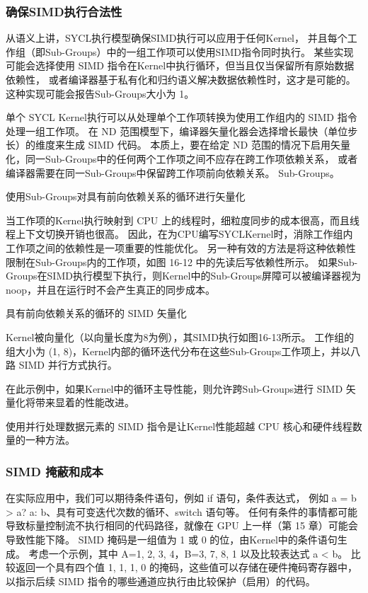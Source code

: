 \subsubsection{确保SIMD执行合法性}
从语义上讲，SYCL执行模型确保SIMD执行可以应用于任何Kernel，
并且每个工作组（即Sub-Groups）中的一组工作项可以使用SIMD指令同时执行。 
某些实现可能会选择使用 SIMD 指令在Kernel中执行循环，但当且仅当保留所有原始数据依赖性，
或者编译器基于私有化和归约语义解决数据依赖性时，这才是可能的。 这种实现可能会报告Sub-Groups大小为 1。

单个 SYCL Kernel执行可以从处理单个工作项转换为使用工作组内的 SIMD 指令处理一组工作项。 
在 ND 范围模型下，编译器矢量化器会选择增长最快（单位步长）的维度来生成 SIMD 代码。 
本质上，要在给定 ND 范围的情况下启用矢量化，同一Sub-Groups中的任何两个工作项之间不应存在跨工作项依赖关系，
或者编译器需要在同一Sub-Groups中保留跨工作项前向依赖关系。 Sub-Groups。

{\color{red} 使用Sub-Groups对具有前向依赖关系的循环进行矢量化}

当工作项的Kernel执行映射到 CPU 上的线程时，细粒度同步的成本很高，而且线程上下文切换开销也很高。 
因此，在为CPU编写SYCLKernel时，消除工作组内工作项之间的依赖性是一项重要的性能优化。 
另一种有效的方法是将这种依赖性限制在Sub-Groups内的工作项，如图 16-12 中的先读后写依赖性所示。 
如果Sub-Groups在SIMD执行模型下执行，则Kernel中的Sub-Groups屏障可以被编译器视为noop，并且在运行时不会产生真正的同步成本。

{\color{red} 具有前向依赖关系的循环的 SIMD 矢量化}

Kernel被向量化（以向量长度为8为例），其SIMD执行如图16-13所示。 
工作组的组大小为 (1, 8)，Kernel内部的循环迭代分布在这些Sub-Groups工作项上，并以八路 SIMD 并行方式执行。

在此示例中，如果Kernel中的循环主导性能，则允许跨Sub-Groups进行 SIMD 矢量化将带来显着的性能改进。

使用并行处理数据元素的 SIMD 指令是让Kernel性能超越 CPU 核心和硬件线程数量的一种方法。

\subsubsection{SIMD 掩蔽和成本}
在实际应用中，我们可以期待条件语句，例如 if 语句，条件表达式，
例如 a = b > a? a: b、具有可变迭代次数的循环、switch 语句等。 
任何有条件的事情都可能导致标量控制流不执行相同的代码路径，就像在 GPU 上一样（第 15 章）可能会导致性能下降。 
SIMD 掩码是一组值为 1 或 0 的位，由Kernel中的条件语句生成。 
考虑一个示例，其中 A={1, 2, 3, 4}，B={3, 7, 8, 1} 以及比较表达式 a < b。 
比较返回一个具有四个值 {1, 1, 1, 0} 的掩码，这些值可以存储在硬件掩码寄存器中，
以指示后续 SIMD 指令的哪些通道应执行由比较保护（启用）的代码。

